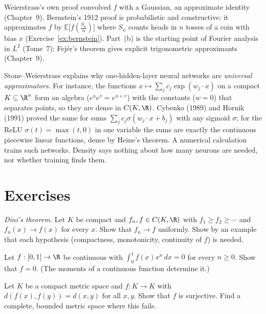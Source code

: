 Weierstrass's own proof convolved $f$ with a Gaussian, an approximate identity (Chapter~9). Bernstein's 1912 proof is probabilistic and
constructive: it approximates $f$ by $\mathbb E\bigl[f(\frac{S_n}n)\bigr]$ where $S_n$ counts heads in $n$ tosses of a coin with bias $x$ (Exercise~\ref{ex:bernstein}). Part~(b) is the
starting point of Fourier analysis in $L^2$ (Tome~7); Fej\'er's theorem gives explicit trigonometric approximants (Chapter~9).

\begin{remark}
Stone--Weierstrass explains why one-hidden-layer neural networks are \emph{universal approximators}. For instance, the functions
$x\mapsto\sum_jc_j\exp(w_j\cdot x)$ on a compact $K\subseteq\R^n$ form an algebra ($e^{u}e^{v}=e^{u+v}$) with the constants ($w=0$) that separates points, so they are dense in $C(K,\R)$.
Cybenko (1989) and Hornik (1991) proved the same for sums $\sum_jc_j\sigma(w_j\cdot x+b_j)$ with any sigmoid $\sigma$; for the ReLU $\sigma(t)=\max(t,0)$ in one variable the sums
are exactly the continuous piecewise linear functions, dense by Heine's theorem. A numerical calculation trains such networks. Density says nothing about
how many neurons are needed, nor whether training finds them.
\end{remark}

\section{Exercises}

\begin{exercise}[$\star$]\label{ex:dini}
\emph{Dini's theorem.} Let $K$ be compact and $f_n,f\in C(K,\R)$ with $f_1\ge f_2\ge\cdots$ and $f_n(x)\to f(x)$ for every $x$. Show that $f_n\to f$ uniformly. Show by an example that each
hypothesis (compactness, monotonicity, continuity of $f$) is needed.
\end{exercise}

\begin{exercise}[$\star$]\label{ex:moments}
Let $f:[0,1]\to\R$ be continuous with $\int_0^1f(x)x^n\,dx=0$ for every $n\ge0$. Show that $f=0$. (The moments of a continuous function determine it.)
\end{exercise}

\begin{exercise}[$\star\star$]\label{ex:isometry}
Let $K$ be a compact metric space and $f:K\to K$ with $d(f(x),f(y))=d(x,y)$ for all $x,y$. Show that $f$ is surjective. Find a complete, bounded metric space where this fails.
\end{exercise}

